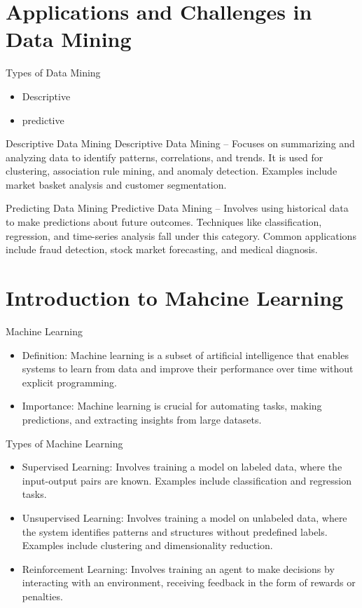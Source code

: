 \documentclass{beamer}
\begin{document}
\section{Applications and Challenges in Data Mining}

\begin{frame}{Types of Data Mining}
    \begin{itemize}
        \item Descriptive
        \item predictive
    \end{itemize}
\end{frame}

\begin{frame}{Descriptive Data Mining}
Descriptive Data Mining – Focuses on summarizing and analyzing data to identify patterns, correlations, and trends. It is used for clustering, association rule mining, and anomaly detection. Examples include market basket analysis and customer segmentation.
\end{frame}
\begin{frame}{Predicting Data Mining}
Predictive Data Mining – Involves using historical data to make predictions about future outcomes. Techniques like classification, regression, and time-series analysis fall under this category. Common applications include fraud detection, stock market forecasting, and medical diagnosis.
\end{frame}

\section{Introduction to Mahcine Learning}
\begin{frame}{Machine Learning}
    \begin{itemize}
        \item Definition: Machine learning is a subset of artificial intelligence that enables systems to learn from data and improve their performance over time without explicit programming.
        \item Importance: Machine learning is crucial for automating tasks, making predictions, and extracting insights from large datasets.
    \end{itemize}
\end{frame}

\begin{frame}{Types of Machine Learning}
    \begin{itemize}
        \item Supervised Learning: Involves training a model on labeled data, where the input-output pairs are known. Examples include classification and regression tasks.
        \item Unsupervised Learning: Involves training a model on unlabeled data, where the system identifies patterns and structures without predefined labels. Examples include clustering and dimensionality reduction.
        \item Reinforcement Learning: Involves training an agent to make decisions by interacting with an environment, receiving feedback in the form of rewards or penalties.
    \end{itemize}
\end{frame}
\end{document}
